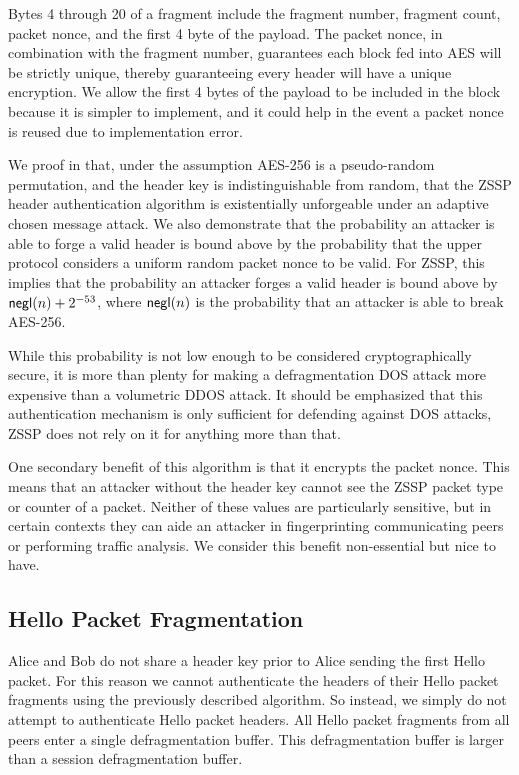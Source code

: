 \documentclass{article}
\begin{document}
Bytes 4 through 20 of a fragment include the fragment number, fragment count, packet nonce, and the first 4 byte of the payload. The packet nonce, in combination with the fragment number, guarantees each block fed into AES will be strictly unique, thereby guaranteeing every header will have a unique encryption. We allow the first 4 bytes of the payload to be included in the block because it is simpler to implement, and it could help in the event a packet nonce is reused due to implementation error.

We proof in  that, under the assumption AES-256 is a pseudo-random permutation, and the header key is indistinguishable from random, that the ZSSP header authentication algorithm is existentially unforgeable under an adaptive chosen message attack. We also demonstrate that the probability an attacker is able to forge a valid header is bound above by the probability that the upper protocol considers a uniform random packet nonce to be valid. For ZSSP, this implies that the probability an attacker forges a valid header is bound above by $\text{\sf negl}(n) + 2^{-53}$, where $\text{\sf negl}(n)$ is the probability that an attacker is able to break AES-256.

While this probability is not low enough to be considered cryptographically secure, it is more than plenty for making a defragmentation DOS attack more expensive than a volumetric DDOS attack. It should be emphasized that this authentication mechanism is only sufficient for defending against DOS attacks, ZSSP does not rely on it for anything more than that.

One secondary benefit of this algorithm is that it encrypts the packet nonce. This means that an attacker without the header key cannot see the ZSSP packet type or counter of a packet. Neither of these values are particularly sensitive, but in certain contexts they can aide an attacker in fingerprinting communicating peers or performing traffic analysis. We consider this benefit non-essential but nice to have.

\subsection{Hello Packet Fragmentation}

Alice and Bob do not share a header key prior to Alice sending the first Hello packet. For this reason we cannot authenticate the headers of their Hello packet fragments using the previously described algorithm. So instead, we simply do not attempt to authenticate Hello packet headers. All Hello packet fragments from all peers enter a single defragmentation buffer. This defragmentation buffer is larger than a session defragmentation buffer.
\end{document}
